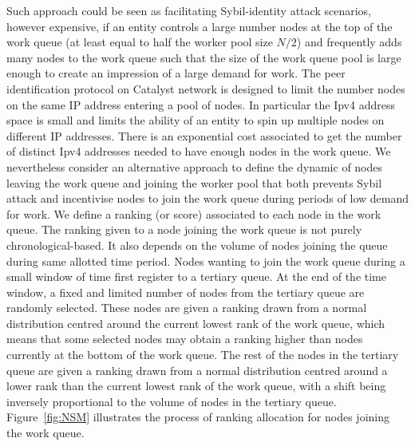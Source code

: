 Such approach could be seen as facilitating Sybil-identity attack scenarios, however expensive, if an entity controls a large number nodes at the top of the work queue (at least equal to half the worker pool size $N/2$) and frequently adds many nodes to the work queue such that the size of the work queue pool is large enough to create an impression of a large demand for work. The peer identification protocol on Catalyst network is designed to limit the number nodes on the same IP address entering a pool of nodes. In particular the Ipv4 address space is small and limits the ability of an entity to spin up multiple nodes on different IP addresses. There is an exponential cost associated to get the number of distinct Ipv4 addresses needed to have enough nodes in the work queue.
We nevertheless consider an alternative approach to define the dynamic of nodes leaving the work queue and joining the worker pool that both prevents Sybil attack and incentivise nodes to join the work queue during periods of low demand for work. We define a ranking (or score) associated to each node in the work queue. The ranking given to a node joining the work queue is not purely chronological-based. It also depends on the volume of nodes joining the queue during same allotted time period. Nodes wanting to join the work queue during a small window of time first register to a tertiary queue. At the end of the time window, a fixed and limited number of nodes from the tertiary queue are randomly selected. These nodes are given a ranking drawn from a normal distribution centred around the current lowest rank of the work queue, which means that some selected nodes may obtain a ranking higher than nodes currently at the bottom of the work queue. The rest of the nodes in the tertiary queue are given a ranking drawn from a normal distribution centred around a lower rank than the current lowest rank of the work queue, with a shift being inversely proportional to the volume of nodes in the tertiary queue. Figure~\ref{fig:NSM} illustrates the process of ranking allocation for nodes joining the work queue. 

